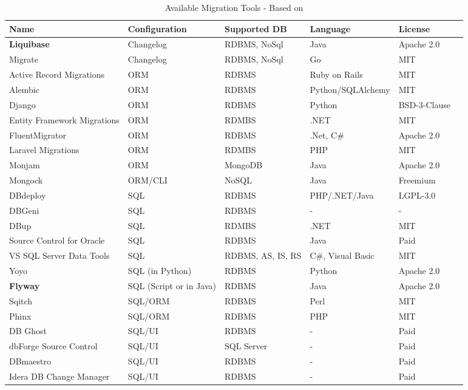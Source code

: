 \begin{table}[H]
	\centering
	\begin{tabularx}{15.5cm}{p{3cm} p{3cm} p{2cm} l l p{2cm} }
		\toprule
		Name & Configuration & Supported DB  & Language & License\\ 
		\midrule
		\textbf{Liquibase} &Changelog & RDBMS, NoSql & Java & Apache 2.0 \\
		Migrate & Changelog & RDBMS, NoSql &  Go & MIT\\
		Active Record Migrations & ORM & RDBMS & Ruby on Rails & MIT\\
		Alembic & ORM & RDBMS & Python/SQLAlchemy &  MIT \\
		Django & ORM & RDBMS& Python & BSD-3-Clause\\
		Entity Framework Migrations & ORM & RDMBS & .NET & MIT \\
		FluentMigrator & ORM &RDBMS& .Net, C\# & Apache 2.0\\
		Laravel Migrations & ORM & RDMBS & PHP & MIT \\
		Monjam & ORM &MongoDB&Java&Apache 2.0\\
		Mongock&ORM/CLI & NoSQL & Java & Freemium\\
		DBdeploy &SQL & RDBMS & PHP/.NET/Java & LGPL-3.0\\
		DBGeni &SQL & RDBMS & - & -\\
		DBup &SQL & RDMBS& .NET & MIT\\
		Source Control for Oracle &SQL & RDBMS & Java & Paid\\
		VS SQL Server Data Tools &SQL & RDBMS, \gls{AS}, \gls{IS}, \gls{RS} & C\#, Visual Basic & MIT \\
		Yoyo & SQL (in Python) & RDBMS & Python & Apache 2.0\\
		\textbf{Flyway} & SQL (Script or in Java) & RDBMS & Java & Apache 2.0 \\
		Sqitch &SQL/ORM & RDBMS & Perl & MIT \\
		Phinx &SQL/ORM & RDBMS &  PHP & MIT\\
		DB Ghost &SQL/UI & RDBMS & - & Paid\\
		dbForge Source Control &SQL/UI & SQL Server & - & Paid\\
		DBmaestro &SQL/UI & RDBMS & - & Paid\\
		Idera DB Change Manager &SQL/UI & RDBMS & - & Paid\\
		\bottomrule
	\end{tabularx}
	\caption{Available Migration Tools - Based on \cite{GoogleCloudTools, DBMSTools}}
	\label{tab:migration_tools}
\end{table}

